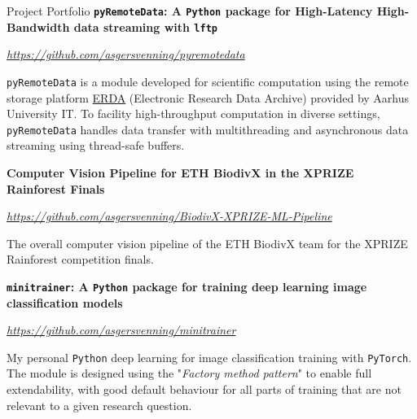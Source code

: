 \begin{rubric}{Project Portfolio}
%
    \textbf{\texttt{pyRemoteData}: A \texttt{Python} package for High-Latency High-Bandwidth data streaming with \texttt{lftp}}\par
    \href{https://github.com/asgersvenning/pyremotedata}{\color{blue}\textit{https://github.com/asgersvenning/pyremotedata}}\par
    \pind \texttt{pyRemoteData} is a module developed for scientific computation using the remote storage platform \href{https://erda.au.dk/}{ERDA} (Electronic Research Data Archive) provided by Aarhus University IT. To facility high-throughput computation in diverse settings, \mbox{\texttt{pyRemoteData}} handles data transfer with multithreading and asynchronous data streaming using thread-safe buffers.

%
    \textbf{Computer Vision Pipeline for ETH BiodivX in the XPRIZE Rainforest Finals}\par
    \href{https://github.com/asgersvenning/BiodivX-XPRIZE-ML-Pipeline}{\color{blue}\textit{https://github.com/asgersvenning/BiodivX-XPRIZE-ML-Pipeline}}\par
    \pind The overall computer vision pipeline of the ETH BiodivX team for the XPRIZE Rainforest competition finals.

%
    \textbf{\texttt{mini\textunderscore trainer}: A \texttt{Python} package for training deep learning image classification models}\par
    \href{https://github.com/asgersvenning/mini_trainer}{\color{blue}\textit{https://github.com/asgersvenning/mini\textunderscore trainer}}\par
    \pind My personal \texttt{Python} deep learning for image classification training with \texttt{PyTorch}. The module is designed using the "\textit{Factory method pattern}" to enable full extendability, with good default behaviour for all parts of training that are not relevant to a given research question.

\end{rubric}